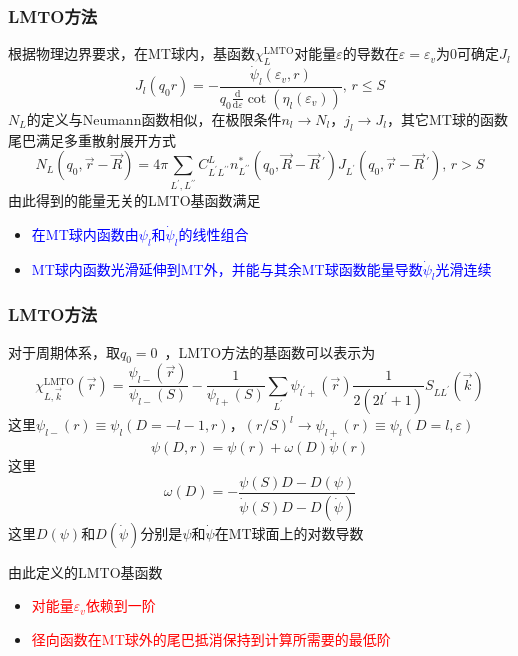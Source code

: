 {\frame
{
	\frametitle{\textrm{LMTO}方法}
	根据物理边界要求，在\textrm{MT}球内，基函数$\chi_L^{\mathrm{LMTO}}$对能量$\varepsilon$的导数在$\varepsilon=\varepsilon_v$为0可确定$J_l$
		\begin{displaymath}
			J_l(q_0r)=-\dfrac{\dot{\psi}_l(\varepsilon_v,r)}{q_0\frac{\mathrm{d}}{\mathrm{d}\varepsilon}\cot(\eta_l(\varepsilon_v))},\,r\leqslant S
		\end{displaymath}
		$N_L$的定义与\textrm{Neumann}函数相似，在极限条件$n_l\rightarrow N_l$，$j_l\rightarrow J_l$，其它\textrm{MT}球的函数尾巴满足多重散射展开方式
		\begin{displaymath}
				N_L(q_0,\vec r-\vec R)=4\pi\sum_{L^{\prime},L^{\prime\prime}}C_{L^{\prime}L^{\prime\prime}}^Ln_{L^{\prime\prime}}^{\ast}(q_0,\vec R-\vec R\,^{\prime})J_{L^{\prime}}(q_0,\vec r-\vec R\,^{\prime}),\,r>S
		\end{displaymath}
		由此得到的能量无关的\textrm{LMTO}基函数满足
		\begin{itemize}
			\item \textcolor{blue}{在\textrm{MT}球内函数由$\psi_l$和$\dot{\psi}_l$的线性组合}
			\item \textcolor{blue}{\textrm{MT}球内函数光滑延伸到\textrm{MT}外，并能与其余\textrm{MT}球函数能量导数$\dot{\psi}_l$光滑连续}
		\end{itemize}
}

\frame
{
	\frametitle{\textrm{LMTO}方法}
	对于周期体系，取$q_0=0$~，\textrm{LMTO}方法的基函数可以表示为
	\begin{displaymath}
		\chi_{L,\vec k}^{\mathrm{LMTO}}(\vec r)=\dfrac{\psi_{l-}(\vec r)}{\psi_{l-}(S)}-\dfrac1{\psi_{l+}(S)}\sum_{L^{\prime}}\psi_{l^{\prime}+}(\vec r)\dfrac1{2(2l^{\prime}+1)}S_{LL^{\prime}}(\vec k)
	\end{displaymath}
	这里$\psi_{l-}(r)\equiv\psi_l(D=-l-1,r)$，$(r/S)^l\rightarrow\psi_{l+}(r)\equiv\psi_l(D=l,\varepsilon)$
	$$\psi(D,r)=\psi(r)+\omega(D)\dot\psi(r)$$
	这里
	$$\omega(D)=-\dfrac{\psi(S)D-D(\psi)}{\dot\psi(S)D-D(\dot\psi)}$$
	这里$D(\psi)$和$D(\dot\psi)$分别是$\psi$和$\dot\psi$在\textrm{MT}球面上的对数导数

	由此定义的\textrm{LMTO}基函数
	\begin{itemize}
		\item \textcolor{red}{对能量$\varepsilon_v$依赖到一阶}
		\item \textcolor{red}{径向函数在\textrm{MT}球外的尾巴抵消保持到计算所需要的最低阶}
	\end{itemize}
}

}
